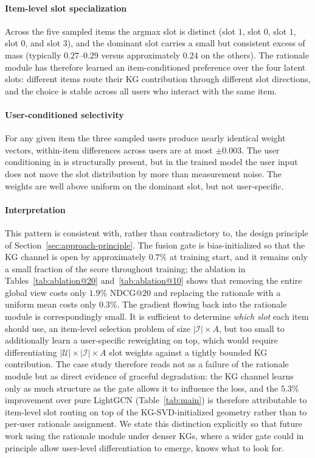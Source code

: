 \paragraph{Item-level slot specialization} Across the five sampled items the argmax slot is distinct (slot $1$, slot $0$, slot $1$, slot $0$, and slot $3$), and the dominant slot carries a small but consistent excess of mass (typically $0.27$--$0.29$ versus approximately $0.24$ on the others). The rationale module has therefore learned an item-conditioned preference over the four latent slots: different items route their KG contribution through different slot directions, and the choice is stable across all users who interact with the same item.

\paragraph{User-conditioned selectivity} For any given item the three sampled users produce nearly identical weight vectors, within-item differences across users are at most $\pm 0.003$. The user conditioning in  is structurally present, but in the trained model the user input does not move the slot distribution by more than measurement noise. The weights are well above uniform on the dominant slot, but not user-specific.

\paragraph{Interpretation} This pattern is consistent with, rather than contradictory to, the design principle of Section~\ref{sec:approach-principle}. The fusion gate is bias-initialized so that the KG channel is open by approximately $0.7\%$ at training start, and it remains only a small fraction of the score throughout training; the ablation in Tables~\ref{tab:ablation@20} and~\ref{tab:ablation@10} shows that removing the entire global view costs only $1.9\%$ NDCG@$20$ and replacing the rationale with a uniform mean costs only $0.3\%$. The gradient flowing back into the rationale module is correspondingly small. It is sufficient to determine \emph{which slot} each item should use, an item-level selection problem of size $|\mathcal{I}| \times A$, but too small to additionally learn a user-specific reweighting on top, which would require differentiating $|\mathcal{U}| \times |\mathcal{I}| \times A$ slot weights against a tightly bounded KG contribution. The case study therefore reads not as a failure of the rationale module but as direct evidence of graceful degradation: the KG channel learns only as much structure as the gate allows it to influence the loss, and the $5.3\%$ improvement over pure LightGCN (Table~\ref{tab:main}) is therefore attributable to item-level slot routing on top of the KG-SVD-initialized geometry rather than to per-user rationale assignment. We state this distinction explicitly so that future work using the rationale module under denser KGs, where a wider gate could in principle allow user-level differentiation to emerge, knows what to look for.

